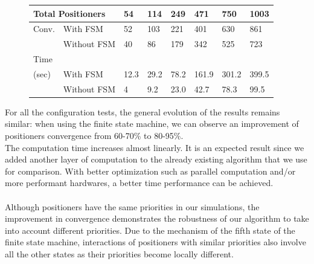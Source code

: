 \documentclass[]{spie}  %
\begin{document}
\begin{figure}[H]
\begin{minipage}{7.5cm}
{				\tiny
				\begin{tabular}{|l|l|l|l|l|l|l|l|}
					\hline
					\multicolumn{2}{|l|}{Total Positioners}  & 54 & 114 & 249 & 471 & 750 & 1003\\
					\hline
					Conv. & With FSM  & 52 & 103 & 221 & 401 & 630 & 861 \\
					\cline{2-8}
					& Without FSM & 40  & 86 & 179 & 342 & 525 & 723 \\
					\hline
					Time\\(sec) & With FSM  & 12.3 & 29.2 & 78.2 & 161.9 & 301.2 & 399.5 \\
					\cline{2-8}
					& Without FSM  & 4  & 9.2 & 23.0 & 42.7 & 78.3  & 99.5 \\
					\hline
				\end{tabular}}
				\label{configuration8_result} 
			\end{minipage}
		\end{figure}					
	For all the configuration tests, the general evolution of the results remains similar: when using the finite state machine, we can observe an improvement of positioners convergence from 60-70\% to 80-95\%.\\
	The computation time increases almost linearly. It is an expected result since we added another layer of computation to the already existing algorithm that we use for comparison. With better optimization such as parallel computation and/or more performant hardwares, a better time performance can be achieved.\\\\
	 Although positioners have the same priorities in our simulations, the improvement in convergence demonstrates the robustness of our algorithm to take into account different priorities. Due to the mechanism of the fifth state of the finite state machine, interactions of positioners with similar priorities also involve all the other states as their priorities become locally different. 	
\end{document}
